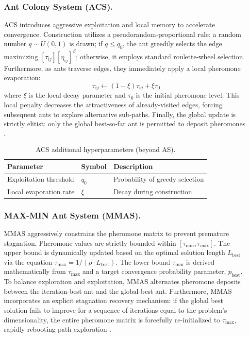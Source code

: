\subsubsection{Ant Colony System (ACS).}
ACS introduces aggressive exploitation and local memory to accelerate convergence. Construction utilizes a pseudorandom-proportional rule: a random number $q \sim U(0,1)$ is drawn; if $q \leq q_0$, the ant greedily selects the edge maximizing $[\tau_{ij}] [\eta_{ij}]^\beta$; otherwise, it employs standard roulette-wheel selection. Furthermore, as ants traverse edges, they immediately apply a local pheromone evaporation:
\begin{equation}
    \tau_{ij} \gets (1 - \xi)\tau_{ij} + \xi \tau_0
\end{equation}
where $\xi$ is the local decay parameter and $\tau_0$ is the initial pheromone level. This local penalty decreases the attractiveness of already-visited edges, forcing subsequent ants to explore alternative sub-paths. Finally, the global update is strictly elitist: only the global best-so-far ant is permitted to deposit pheromones \autocite{DorigoBirattariStutzle2007}.

\begin{table}[H]
\centering
\caption{ACS additional hyperparameters (beyond AS).}
\label{tab:acs-params}
\begin{tabular}{l l p{7cm}}
\hline
\textbf{Parameter} & \textbf{Symbol} & \textbf{Description} \\
\hline
Exploitation threshold & $q_0$     & Probability of greedy selection \\
Local evaporation rate & $\xi$     & Decay during construction \\
\hline
\end{tabular}
\end{table}

\subsubsection{MAX-MIN Ant System (MMAS).}
MMAS aggressively constrains the pheromone matrix to prevent premature stagnation. Pheromone values are strictly bounded within $[\tau_{\min}, \tau_{\max}]$. The upper bound is dynamically updated based on the optimal solution length $L_{\text{best}}$ via the equation $\tau_{\max} = 1 / (\rho \cdot L_{\text{best}})$. The lower bound $\tau_{\min}$ is derived mathematically from $\tau_{\max}$ and a target convergence probability parameter, $p_{\text{best}}$. To balance exploration and exploitation, MMAS alternates pheromone deposits between the iteration-best ant and the global-best ant. Furthermore, MMAS incorporates an explicit stagnation recovery mechanism: if the global best solution fails to improve for a sequence of iterations equal to the problem's dimensionality, the entire pheromone matrix is forcefully re-initialized to $\tau_{\max}$, rapidly rebooting path exploration \autocite{DorigoBirattariStutzle2007}.


